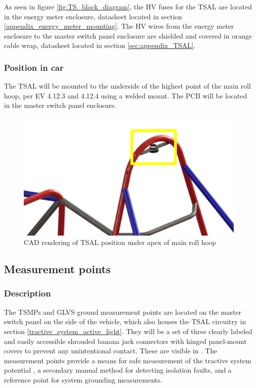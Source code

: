 \documentclass{article}
\begin{document}
As seen in figure \ref{fig:TS_block_diagram}, the HV fuses for the TSAL are located in the energy meter enclosure, datasheet located in section \ref{appendix_energy_meter_mounting}. The HV wires from the energy meter enclosure to the master switch panel enclosure are shielded and covered in orange cable wrap, datasheet located in section \ref{sec:appendix_TSAL}. 

\subsubsection{Position in car}
The TSAL will be mounted to the underside of the highest point of the main roll hoop, per EV 4.12.3 and 4.12.4 using a welded mount. The PCB will be located in the master switch panel enclosure.

\begin{figure}[H]
\centering
\includegraphics[scale=1]{TSAL_mounting.png}
\caption{CAD rendering of TSAL position under apex of main roll hoop}
\end{figure}

\subsection{Measurement points}\label{measurement_points}
\subsubsection{Description}
The TSMPs and GLVS ground measurement points are located on the master switch panel on the side of the vehicle, which also houses the TSAL circuitry in section \ref{tractive_system_active_light}. They will be a set of three clearly labeled and easily accessible shrouded banana jack connectors with hinged panel-mount covers to prevent any unintentional contact. These are visible in . The measurement points provide a means for safe measurement of the tractive system potential , a secondary manual method for detecting isolation faults, and a reference point for system grounding  measurements. 
\end{document}
